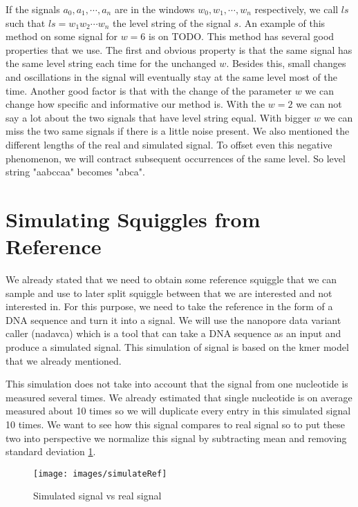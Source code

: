
If the signals $a_0, a_1, \cdots, a_n$ are in the windows $w_0, w_1, \cdots ,w_n$
respectively, we call $ls$ such that $ls=w_1w_2\cdots w_n$ the level string of the
signal $s$. An example of this method on some signal for $w=6$ is on TODO. This method has
several good properties that we use. The first and obvious property is that the same signal has the
same level string each time for the unchanged $w$. Besides this, small changes and
oscillations in the signal will eventually stay at the same level most of the time.
Another good factor is that with the change of the parameter $w$ we can change how specific
and informative our method is. With the $w=2$ we can not say a lot about the two signals
that have level string equal. With bigger $w$ we can miss the two same signals
if there is a little noise present. We also mentioned the different lengths of
the real and simulated signal. To offset even this negative phenomenon, we will contract
subsequent occurrences of the same level. So level string "aabccaa" becomes "abca".

\section{Simulating Squiggles from Reference}

We already stated that we need to obtain some reference squiggle that we
can sample and use to later split squiggle between that we are interested and not
interested in. For this purpose, we need to take the reference in the form of a DNA sequence
and turn it into a signal. We will use the nanopore data variant caller (nadavca)
which is a tool that can take a DNA sequence as an input and produce a simulated signal.
This simulation of signal is based on the kmer model that we already mentioned. 

This simulation does not take into account that the signal from one nucleotide is
measured several times. We already estimated that single nucleotide is on average
measured about 10 times so we will duplicate every entry in this simulated signal
10 times. We want to see how this signal compares to real signal so to put these
two into perspective we normalize this signal by subtracting mean and removing
standard deviation \ref{obr:simVsReal}.

\begin{figure}
\centerline{\texttt{[image: images/simulateRef]}}
\caption[Hehe]{Simulated signal vs real signal}
\label{obr:simVsReal}
\end{figure}

